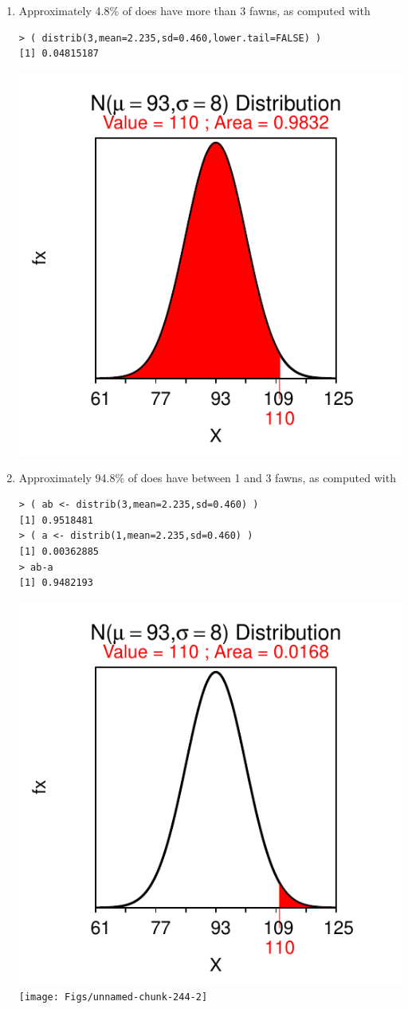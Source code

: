 \documentclass[10pt,openany]{book}\usepackage[]{graphicx}\usepackage[]{color}
\makeatletter
\newenvironment{kframe}{%
 \def\at@end@of@kframe{}%
 \ifinner\ifhmode%
  \def\at@end@of@kframe{\end{minipage}}%
  \begin{minipage}{\columnwidth}%
 \fi\fi%
 \def\FrameCommand##1{\hskip\@totalleftmargin \hskip-\fboxsep
 \colorbox{shadecolor}{##1}\hskip-\fboxsep
     \hskip-\linewidth \hskip-\@totalleftmargin \hskip\columnwidth}%
 \MakeFramed {\advance\hsize-\width
   \@totalleftmargin\z@ \linewidth\hsize
   \@setminipage}}%
 {\par\unskip\endMakeFramed%
 \at@end@of@kframe}
\newenvironment{knitrout}{}{} %
\makeatother
\begin{document}
\begin{itemize}
\begin{enumerate}
\begin{knitrout}
{}



\end{knitrout}
      \item Approximately 4.8\% of does have more than 3 fawns, as computed with
\begin{knitrout}
\color{fgcolor}\begin{kframe}
\begin{verbatim}
> ( distrib(3,mean=2.235,sd=0.460,lower.tail=FALSE) )
[1] 0.04815187
\end{verbatim}
\end{kframe}

{\centering \includegraphics[width=.4\linewidth]{Figs/unnamed-chunk-243-1} 

}



\end{knitrout}
      \item Approximately 94.8\% of does have between 1 and 3 fawns, as computed with
\begin{knitrout}
\color{fgcolor}\begin{kframe}
\begin{verbatim}
> ( ab <- distrib(3,mean=2.235,sd=0.460) )
[1] 0.9518481
> ( a <- distrib(1,mean=2.235,sd=0.460) )
[1] 0.00362885
> ab-a
[1] 0.9482193
\end{verbatim}
\end{kframe}

{\centering \includegraphics[width=.4\linewidth]{Figs/unnamed-chunk-244-1} 
\texttt{[image: Figs/unnamed-chunk-244-2]} 

}
\end{knitrout}
\end{enumerate}
\end{itemize}
\end{document}
